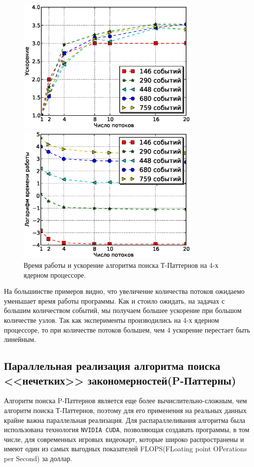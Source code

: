 \documentclass[12pt,fсeqn]{article}
\begin{document}
\begin{figure}[H]
	\begin{multicols}{2}
	\hfill
	\includegraphics[width=90mm]{omp_su.eps}

	\includegraphics[width=90mm]{omp_t.eps}
	\end{multicols}
	\caption[Параллельная реализация алгоритма поиска T-Паттернов]{Время работы и ускорение алгоритма поиска Т-Паттернов на 4-х ядерном процессоре.}
\label{fig:omp_tp}
\end{figure}

На большинстве примеров видно, что увеличение количества потоков
ожидаемо уменьшает время работы программы. Как и стоило ожидать, на задачах с большим количеством 
событий, мы получаем большее ускорение при большом количестве узлов. Так как эксперименты производились
на 4-х ядерном процессоре, то при количестве потоков большем, чем 4 ускорение перестает быть линейным.


\subsection[Параллельная реализация алгоритма поиска P-Паттернов]{Параллельная реализация алгоритма поиска <<нечетких>> закономерностей(P-Паттерны)}
\label{sec:ppat_parallel}
Алгоритм поиска P-Паттернов является еще более вычислительно-сложным, чем алгоритм поиска Т-Паттернов,
поэтому для его применения на реальных данных крайне важна параллельная реализация. 
Для распараллеливания алгоритма была использована технология \verb!NVIDIA CUDA!, позволяющая 
создавать программы, в том числе, для современных игровых видеокарт, которые широко распространены 
и имеют один из самых выгодных показателей FLOPS(FLoating point OPerations per Second) за доллар. 
\end{document}
